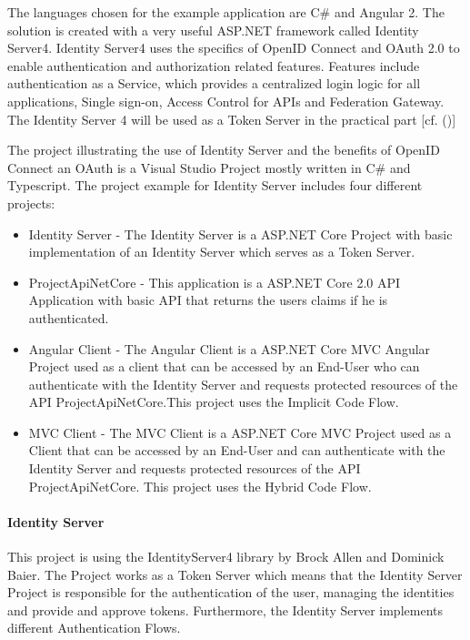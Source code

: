 The languages chosen for the example application are C\# and Angular 2. The solution is created with a very useful ASP.NET framework called Identity Server4. Identity Server4 uses the specifics of OpenID Connect and OAuth 2.0 to enable authentication and authorization related features. Features include authentication as a Service, which provides a centralized login logic for all applications, Single sign-on, Access Control for APIs and Federation Gateway. The Identity Server 4 will be used as a Token Server in the practical part [cf. (\cite{Brock:2018:ID4})]

The project illustrating the use of Identity Server and the benefits of OpenID Connect an OAuth is a Visual Studio Project mostly written in C\# and Typescript. The project example for Identity Server includes four different projects:

\begin{itemize}
	\item Identity Server - The Identity Server is a ASP.NET Core Project with basic implementation of an Identity Server which serves as a Token Server. 
	\item ProjectApiNetCore - This application is a ASP.NET Core 2.0 API Application with basic API that returns the users claims if he is authenticated.
	\item Angular Client - The Angular Client is a ASP.NET Core MVC Angular Project used as a client that can be accessed by an End-User who can authenticate with the Identity Server and requests protected resources of the API ProjectApiNetCore.This project uses the Implicit Code Flow. 
	\item MVC Client - The MVC Client is a ASP.NET Core MVC Project used as a Client that can be accessed by an End-User and can authenticate with the Identity Server and requests protected resources of the API ProjectApiNetCore. This project uses the Hybrid Code Flow. 
\end{itemize}



\paragraph{Identity Server}

This project is using the IdentityServer4 library by Brock Allen and Dominick Baier. The Project works as a Token Server which means that the Identity Server Project is responsible for the authentication of the user, managing the identities and provide and approve tokens. Furthermore, the Identity Server implements different Authentication Flows.


